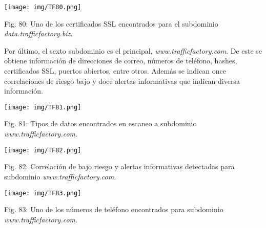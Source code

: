 \documentclass[12pt,oneside,a4paper]{book}
\begin{document}
\begin{center}
	\texttt{[image: img/TF80.png]}
    
\vspace{0.1em}
    
    Fig. 80: Uno de los certificados SSL encontrados para el subdominio \textit{data.trafficfactory.biz}.
\end{center}

\vspace{2em}

\hspace{20pt}
Por último, el sexto subdominio es el principal, \textit{www.trafficfactory.com}. De este se obtiene información de direcciones de correo, números de teléfono, hashes, certificados SSL, puertos abiertos, entre otros. Además se indican once correlaciones de riesgo bajo y doce alertas informativas que indican diversa información.

\vspace{2em}

\begin{center}
	\texttt{[image: img/TF81.png]}
    
\vspace{0.1em}
    
    Fig. 81: Tipos de datos encontrados en escaneo a subdominio \textit{www.trafficfactory.com}.
\end{center}

\vspace{2em}

\begin{center}
	\texttt{[image: img/TF82.png]}
    
\vspace{0.1em}
    
    Fig. 82: Correlación de bajo riesgo y alertas informativas detectadas para subdominio \textit{www.trafficfactory.com}.
\end{center}

\vspace{2em}

\begin{center}
	\texttt{[image: img/TF83.png]}
    
\vspace{0.1em}
    
    Fig. 83: Uno de los números de teléfono encontrados para subdominio \textit{www.trafficfactory.com}.
\end{center}

\vspace{2em}
\end{document}
